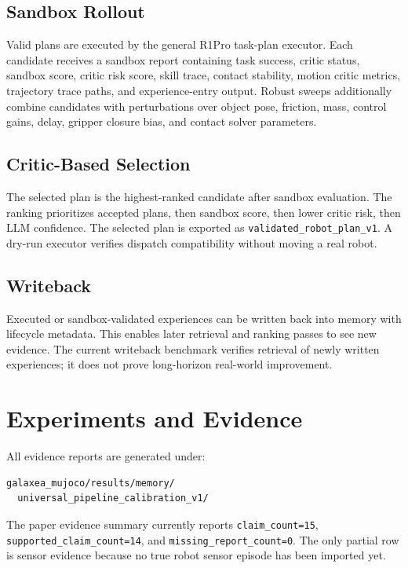 \documentclass[conference]{IEEEtran}
\begin{document}
\subsection{Sandbox Rollout}
Valid plans are executed by the general R1Pro task-plan executor. Each candidate receives a sandbox report containing task success, critic status, sandbox score, critic risk score, skill trace, contact stability, motion critic metrics, trajectory trace paths, and experience-entry output. Robust sweeps additionally combine candidates with perturbations over object pose, friction, mass, control gains, delay, gripper closure bias, and contact solver parameters.

\subsection{Critic-Based Selection}
The selected plan is the highest-ranked candidate after sandbox evaluation. The ranking prioritizes accepted plans, then sandbox score, then lower critic risk, then LLM confidence. The selected plan is exported as \texttt{validated\_robot\_plan\_v1}. A dry-run executor verifies dispatch compatibility without moving a real robot.

\subsection{Writeback}
Executed or sandbox-validated experiences can be written back into memory with lifecycle metadata. This enables later retrieval and ranking passes to see new evidence. The current writeback benchmark verifies retrieval of newly written experiences; it does not prove long-horizon real-world improvement.

\section{Experiments and Evidence}
All evidence reports are generated under:
\begin{verbatim}
galaxea_mujoco/results/memory/
  universal_pipeline_calibration_v1/
\end{verbatim}

The paper evidence summary currently reports \texttt{claim\_count=15}, \texttt{supported\_claim\_count=14}, and \texttt{missing\_report\_count=0}. The only partial row is sensor evidence because no true robot sensor episode has been imported yet.
\end{document}
